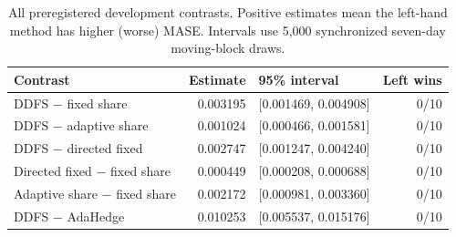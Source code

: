 \begin{table}[h]
\centering
\small
\caption{All preregistered development contrasts. Positive estimates mean the left-hand method has higher (worse) MASE. Intervals use 5,000 synchronized seven-day moving-block draws.}
\label{tab:contrasts}
\begin{tabular}{l r l r}
\toprule
Contrast & Estimate & 95\% interval & Left wins \\
\midrule
\textsc{DDFS} $-$ fixed share & 0.003195 & [0.001469, 0.004908] & 0/10 \\
\textsc{DDFS} $-$ adaptive share & 0.001024 & [0.000466, 0.001581] & 0/10 \\
\textsc{DDFS} $-$ directed fixed & 0.002747 & [0.001247, 0.004240] & 0/10 \\
Directed fixed $-$ fixed share & 0.000449 & [0.000208, 0.000688] & 0/10 \\
Adaptive share $-$ fixed share & 0.002172 & [0.000981, 0.003360] & 0/10 \\
\textsc{DDFS} $-$ AdaHedge & 0.010253 & [0.005537, 0.015176] & 0/10 \\
\bottomrule
\end{tabular}
\end{table}
